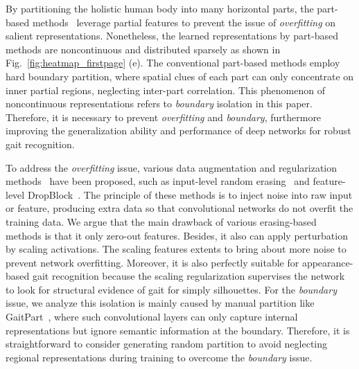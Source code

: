\documentclass[runningheads]{llncs}
\begin{document}
    By partitioning the holistic human body into many horizontal parts, the part-based methods~\cite{gaitpart,gaitgl,2019_part_zhangyuqi} leverage partial features to prevent the issue of \textit{overfitting} on salient representations.
    Nonetheless, the learned representations by part-based methods are noncontinuous and distributed sparsely as shown in Fig.~\ref{fig:heatmap_firstpage} (e). The conventional part-based methods employ hard boundary partition, where spatial clues of each part can only concentrate on inner partial regions, neglecting inter-part correlation. This phenomenon of noncontinuous representations refers to \textit{boundary} isolation in this paper. Therefore, it is necessary to prevent \textit{overfitting} and \textit{boundary}, furthermore improving the generalization ability and performance of deep networks for robust gait recognition.

    To address the \textit{overfitting} issue, various data augmentation and regularization methods~\cite{dropout,batchdropblock} have been proposed, such as input-level random erasing~\cite{RandomErasing} and feature-level DropBlock~\cite{ghiasi2018dropblock}. 
    The principle of these methods is to inject noise into raw input or feature, producing extra data so that convolutional networks do not overfit the training data. We argue that the main drawback of various erasing-based methods is that it only zero-out features. Besides, it also can apply perturbation by scaling activations. The scaling features extents to bring about more noise to prevent network overfitting. Moreover, it is also perfectly suitable for appearance-based gait recognition because the scaling regularization supervises the network to look for structural evidence of gait for simply silhouettes.
    For the \textit{boundary} issue, we analyze this isolation is mainly caused by manual partition like GaitPart~\cite{gaitpart}, where such convolutional layers can only capture internal representations but ignore semantic information at the boundary. Therefore, it is straightforward to consider generating random partition to avoid neglecting regional representations during training to overcome the \textit{boundary} issue. 
\end{document}
